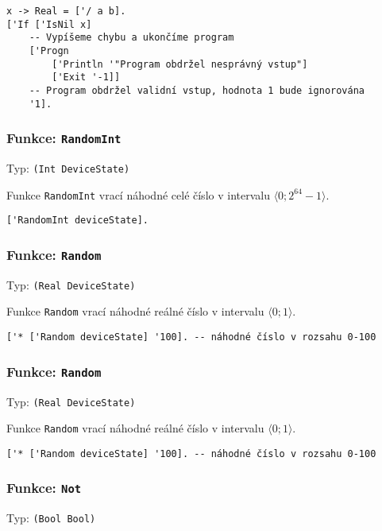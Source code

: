 \begin{lstlisting}[caption={Ukázka využití Exit}]
x -> Real = ['/ a b].
['If ['IsNil x]
    -- Vypíšeme chybu a ukončíme program
    ['Progn
        ['Println '"Program obdržel nesprávný vstup"]
        ['Exit '-1]]
    -- Program obdržel validní vstup, hodnota 1 bude ignorována
    '1].
\end{lstlisting}

\subsubsection*{Funkce: \lstinline{RandomInt}}
Typ: \lstinline{(Int DeviceState)}

Funkce \lstinline{RandomInt} vrací náhodné celé číslo v intervalu $\bigl \langle 0; 2^{64}-1 \bigr \rangle$.

\begin{lstlisting}[caption={Ukázka využití RandomInt}]
['RandomInt deviceState].
\end{lstlisting}

\subsubsection*{Funkce: \lstinline{Random}}
Typ: \lstinline{(Real DeviceState)}

Funkce \lstinline{Random} vrací náhodné reálné číslo v intervalu $\bigl \langle 0; 1 \bigr \rangle$.

\begin{lstlisting}[caption={Ukázka využití Random}]
['* ['Random deviceState] '100]. -- náhodné číslo v rozsahu 0-100
\end{lstlisting}

\subsubsection*{Funkce: \lstinline{Random}}
Typ: \lstinline{(Real DeviceState)}

Funkce \lstinline{Random} vrací náhodné reálné číslo v intervalu $\bigl \langle 0; 1 \bigr \rangle$.

\begin{lstlisting}[caption={Ukázka využití Random}]
['* ['Random deviceState] '100]. -- náhodné číslo v rozsahu 0-100
\end{lstlisting}

\subsubsection*{Funkce: \lstinline{Not}}
Typ: \lstinline{(Bool Bool)}

